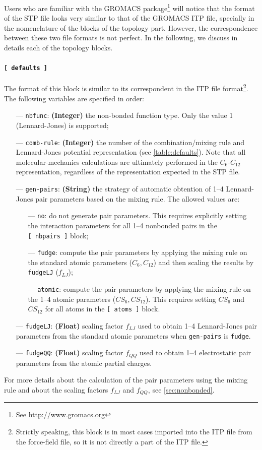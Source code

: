 \documentclass[10pt,a4paper,openany]{memoir}
\numberwithin{equation}{section}
\begin{document}
Users who are familiar with the GROMACS
package\footnote{See \url{http://www.gromacs.org}} will notice that the
format of the STP file looks very similar to that of the GROMACS ITP
file, specially in the nomenclature of the blocks of the topology
part. However, the correspondence between these two file formats is
not perfect. In the following, we discuss in details each of the
topology blocks.

\paragraph{\texttt{[~defaults~]}}

The format of this block is similar to its correspondent in the ITP file format\footnote{Strictly speaking, this block is in most cases imported into the ITP file from the force-field file, so it is not directly a part of the ITP file.}.
The following variables are specified in order:
\begin{itemize}
\item [---] \texttt{nbfunc}: \textbf{(Integer)} the non-bonded function type. Only the value 1 (Lennard-Jones) is supported;
\item [---] \texttt{comb-rule}: \textbf{(Integer)} the number of the combination/mixing rule and Lennard-Jones potential representation (see \autoref{table:defaults}).
  Note that all molecular-mechanics calculations are ultimately performed in the $C_6$-$C_{12}$ representation, regardless of the representation expected in the STP file.
\item [---] \texttt{gen-pairs}: \textbf{(String)} the strategy of automatic obtention of  1--4 Lennard-Jones pair parameters based on the mixing rule. The allowed values are:
  \begin{itemize}
  \item [---] \texttt{no}: do not generate pair parameters. This requires explicitly setting the interaction parameters for all 1--4 nonbonded pairs in the \texttt{[~nbpairs~]} block;
  \item [---] \texttt{fudge}: compute the pair parameters by applying the mixing rule on the standard atomic parameters ($C_6,C_{12}$) and then scaling the results by \texttt{fudgeLJ} ($f_{LJ}$);
  \item [---] \texttt{atomic}: compute the pair parameters by applying the mixing rule on the 1--4 atomic parameters ($CS_6,CS_{12}$). This requires setting $CS_6$ and $CS_{12}$ for all atoms in the \texttt{[~atoms~]} block.
  \end{itemize}
\item [---] \texttt{fudgeLJ}: \textbf{(Float)} scaling factor $f_{LJ}$ used to obtain 1--4 Lennard-Jones pair parameters from the standard atomic parameters when \texttt{gen-pairs} is \texttt{fudge}.
\item [---] \texttt{fudgeQQ}: \textbf{(Float)} scaling factor $f_{QQ}$ used to obtain 1--4 electrostatic pair parameters from the atomic partial charges.
\end{itemize}
For more details about the calculation of the pair parameters using the mixing rule and about the scaling factors $f_{LJ}$ and $f_{QQ}$, see \autoref{sec:nonbonded}.
\end{document}
